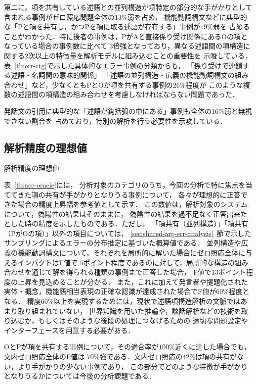 \documentclass[japanese]{jnlp_1.4}
\begin{document}
第二に，項を共有している述語との並列構造が項特定の部分的な手がかりとして含まれる事例がゼロ照応問題全体の$13\%$弱を占め，
機能動詞構文などに典型的な「Pと項を共有し，かつPを項に取る述語が存在する」事例が$19\%$弱を
占めることがわかった．特に後者の事例は，PがAと直接係り受け関係にあるOの項となっている場合の事例数に比べて
$3$倍強となっており，異なる述語間の項構造に関する2次以上の特徴量を解析モデルに組み込むことの重要性を
示唆している．表~\ref{tb:err-ctg}で示した具体的なエラー事例の分類からも，
「係り受けで連鎖する述語・名詞間の意味的関係」
「述語の並列構造・広義の機能動詞構文の組み合わせ」など，少なくともPとOが項を共有する事例の$26\%$程度が
このような複数の述語間の項構造の組み合わせを考慮しなければならない問題であった．

発話文の引用に典型的な「述語が鉤括弧の中にある」事例も全体の$16\%$弱と無視できない割合を
占めており，特別の解析を行う必要性を示唆している．


\subsection{解析精度の理想値}

\begin{table}[b]
\caption{ 解析精度の理想値}
\label{tb:acc-oracle}

\end{table}

表~\ref{tb:acc-oracle}には，
分析対象のカテゴリのうち，今回の分析で特に焦点を当ててきた項の共有が手がかりとなりうる事例について，
各々が理想的に正答できた場合の精度上昇幅を参考値として示す．
この数値は，解析対象のシステムについて，偽陽性の結果はそのままに，
偽陰性の結果を過不足なく正答出来たとした時の精度を示したものである．ただし，
「項共有（並列構造）」「項共有（PがOの項）」以外の項目については，
\ref{sec:shared-arg-err-analysis}~節で示したサンプリングによるエラーの分布推定に基づいた概算値である．
並列構造や広義の機能動詞構文について，それぞれを局所的に解いた場合にゼロ照応全体に与えるインパクトはF値で
$5$ポイント程度であるのに対して，局所的な構造の組み合わせを通じて解を得られる種類の事例まで正答した場合，
F値で$13$ポイント程度の上昇を見込めることが分かる．
また，これに加えて発言者や提題化された実体・概念，機能語相当表現の正確な認識が達成された場合でF値が$60\%$程度となる．
精度$60\%$以上を実現するためには，現状で述語項構造解析の文脈ではあまり取り組まれていない，
世界知識を用いた推論や，談話解析などの技術を取り込むか，もしくはそのような後段の処理につなげるための
適切な問題設定やインターフェースを用意する必要がある．

OとPが項を共有する事例について，その適合率が$100\%$近くに達した場合でも，文内ゼロ照応全体のF値は
$70\%$強である．文内ゼロ照応の$42\%$は項の共有がない，より手がかりの少ない事例であり，
この部分でどのような特徴が手がかりとなりうるかについては今後の分析課題である．
\end{document}
